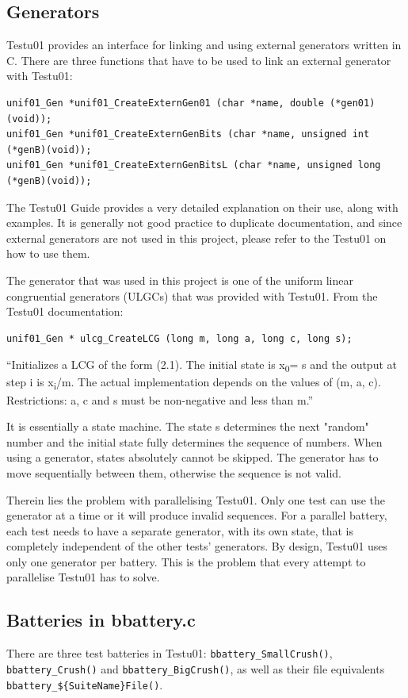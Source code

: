 \subsection{Generators}
Testu01 provides an interface for linking and using external generators written in C.
There are three functions that have to be used to link an external generator with Testu01:
\begin{verbatim}
unif01_Gen *unif01_CreateExternGen01 (char *name, double (*gen01)(void));
unif01_Gen *unif01_CreateExternGenBits (char *name, unsigned int (*genB)(void));
unif01_Gen *unif01_CreateExternGenBitsL (char *name, unsigned long (*genB)(void));
\end{verbatim}

The Testu01 Guide provides a very detailed explanation on their use, along with examples. It is generally not good practice to duplicate documentation, and since external generators are not used in this project, please refer to the Testu01 on how to use them.

The generator that was used in this project is one of the uniform linear congruential generators (ULGCs) that was provided with Testu01.
From the Testu01 documentation\cite{testu01guide-p25}:
\begin{verbatim}
unif01_Gen * ulcg_CreateLCG (long m, long a, long c, long s);
\end{verbatim}

``Initializes a LCG of the form (2.1).
The initial state is x\textsubscript{0}= s and the output at step i is x\textsubscript{i}/m.
The actual implementation depends on the values of (m, a, c). Restrictions: a, c and s must be
non-negative and less than m.''

It is essentially a state machine. The state s determines the next "random" number and the initial state fully determines the sequence of numbers. When using a generator, states absolutely cannot be skipped. The generator has to move sequentially between them, otherwise the sequence is not valid.

Therein lies the problem with parallelising Testu01. Only one test can use the generator at a time or it will produce invalid sequences. For a parallel battery, each test needs to have a separate generator, with its own state, that is completely independent of the other tests' generators. By design, Testu01 uses only one generator per battery. This is the problem that every attempt to parallelise Testu01 has to solve.

\subsection{Batteries in bbattery.c}
There are three test batteries in Testu01: \texttt{bbattery\_SmallCrush()}, \texttt{bbattery\_Crush()} and \texttt{bbattery\_BigCrush()}, as well as their file equivalents \texttt{bbattery\_\$\{SuiteName\}File()}.

